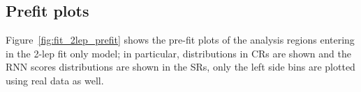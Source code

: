 
\subsection{Prefit plots}
Figure~\ref{fig:fit_2lep_prefit} shows the pre-fit plots of the analysis regions entering in the 2-lep fit only model;
in particular, \mjjtag distributions in \Zjets CRs are shown and the RNN scores distributions are shown in the SRs, only the left side bins are plotted using real data as well.

